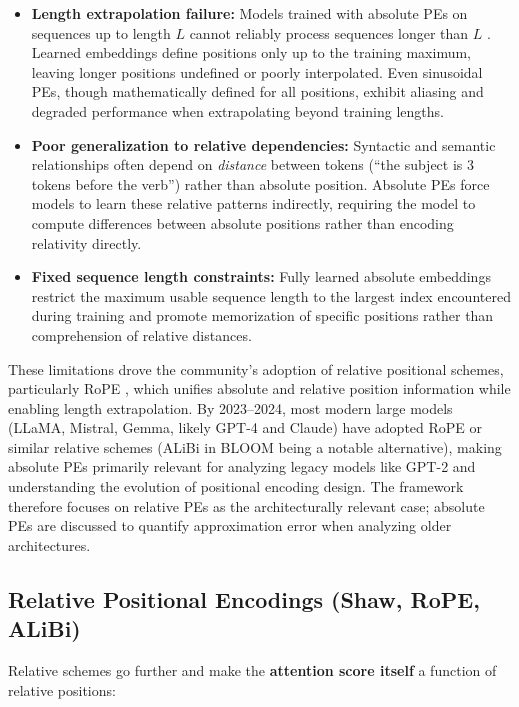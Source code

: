 \documentclass[11pt]{article}
\theoremstyle{definition}
\begin{document}
\begin{itemize}
    \item \textbf{Length extrapolation failure:} Models trained with absolute PEs on sequences up to length $L$ cannot reliably process sequences longer than $L$ \cite{press2022train}. Learned embeddings define positions only up to the training maximum, leaving longer positions undefined or poorly interpolated. Even sinusoidal PEs, though mathematically defined for all positions, exhibit aliasing and degraded performance when extrapolating beyond training lengths.
    \item \textbf{Poor generalization to relative dependencies:} Syntactic and semantic relationships often depend on \emph{distance} between tokens (``the subject is 3 tokens before the verb'') rather than absolute position. Absolute PEs force models to learn these relative patterns indirectly, requiring the model to compute differences between absolute positions rather than encoding relativity directly.
    \item \textbf{Fixed sequence length constraints:} Fully learned absolute embeddings restrict the maximum usable sequence length to the largest index encountered during training and promote memorization of specific positions rather than comprehension of relative distances.
\end{itemize}

These limitations drove the community's adoption of relative positional schemes, particularly RoPE \cite{su2021roformer}, which unifies absolute and relative position information while enabling length extrapolation. By 2023--2024, most modern large models (LLaMA, Mistral, Gemma, likely GPT-4 and Claude) have adopted RoPE or similar relative schemes (ALiBi in BLOOM being a notable alternative), making absolute PEs primarily relevant for analyzing legacy models like GPT-2 and understanding the evolution of positional encoding design. The framework therefore focuses on relative PEs as the architecturally relevant case; absolute PEs are discussed to quantify approximation error when analyzing older architectures.

\subsection{Relative Positional Encodings (Shaw, RoPE, ALiBi)}

Relative schemes go further and make the \textbf{attention score itself} a function of relative positions:
\end{document}
